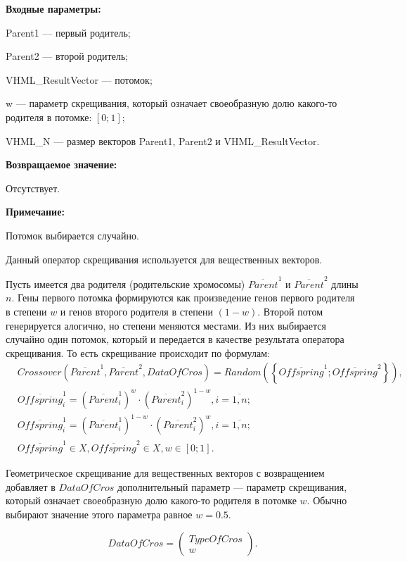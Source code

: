 \textbf{Входные параметры:}
 
Parent1 --- первый родитель;
 
Parent2 --- второй родитель;
 
VHML\_ResultVector --- потомок;

w --- параметр скрещивания, который означает своеобразную долю какого-то родителя в потомке: $[0;1]$;
 
VHML\_N --- размер векторов Parent1, Parent2 и VHML\_ResultVector.

\textbf{Возвращаемое значение:}

 Отсутствует.
 
\textbf{ Примечание:}

 Потомок выбирается случайно.
 
Данный оператор скрещивания используется для вещественных векторов.

Пусть имеется два родителя (родительские хромосомы) $ \overline{Parent}^1 $ и $ \overline{Parent}^2$ длины $n$. Гены первого потомка формируются как произведение генов первого родителя в степени $w$ и генов второго родителя в степени $\left( 1-w\right) $. Второй потом генерируется алогично, но степени меняются местами.  Из них выбирается случайно один потомок, который и передается в качестве результата оператора скрещивания. То есть скрещивание происходит по формулам:
\begin{align}
\label{SetOfOperatorsAlgorithms:eq:GeometricalCrossoverForReal}
&Crossover \left( \overline{Parent}^1, \overline{Parent}^2, DataOfCros\right)=Random \left(\left\lbrace \overline{Offspring}^1; \overline{Offspring}^2\right\rbrace  \right), \\
& \overline{Offspring}^1_i=\left( \overline{Parent}^1_i\right)^w \cdot\left( \overline{Parent}^2_i\right)^{1-w}  , i=\overline{1,n};\nonumber\\
& \overline{Offspring}^1_i=\left( \overline{Parent}^1_i\right)^{1-w} \cdot\left( \overline{Parent}^2_i\right)^w  , i=\overline{1,n};\nonumber\\
&\overline{Offspring}^1\in X, \overline{Offspring}^2\in X, w\in \left[ 0; 1\right] .\nonumber
\end{align}

Геометрическое скрещивание для вещественных векторов с возвращением добавляет в $ DataOfCros $ дополнительный параметр --- параметр скрещивания, который означает своеобразную долю какого-то родителя в потомке $ w $. Обычно выбирают значение этого параметра равное $ w=0.5 $.

\begin{equation}
DataOfCros=\left( \begin{array}{c} TypeOfCros \\ w \end{array} \right).
\end{equation}